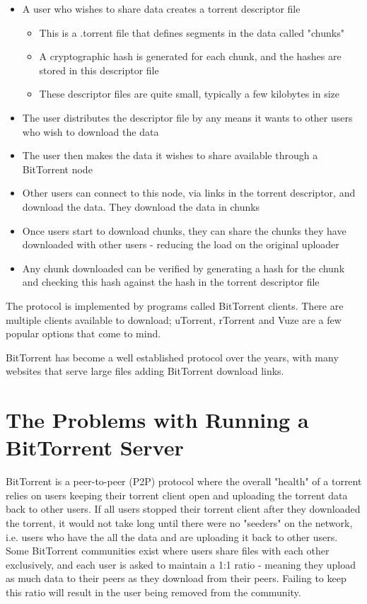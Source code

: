 \begin{itemize}
	\item A user who wishes to share data creates a torrent descriptor file
	\begin{itemize}	
		\item This is a .torrent file that defines segments in the data called "chunks"
		\item A cryptographic hash is generated for each chunk, and the hashes are stored in this descriptor file
		\item These descriptor files are quite small, typically a few kilobytes in size
	\end{itemize}  
	\item The user distributes the descriptor file by any means it wants to other users who wish to download the data
	\item The user then makes the data it wishes to share available through a BitTorrent node
	\item Other users can connect to this node, via links in the torrent descriptor, and download the data. They download the data in chunks 
	\item Once users start to download chunks, they can share the chunks they have downloaded with other users - reducing the load on the original uploader
	\item Any chunk downloaded can be verified by generating a hash for the chunk and checking this hash against the hash in the torrent descriptor file
\end{itemize}

The protocol is implemented by programs called BitTorrent clients. There are multiple clients available to download; uTorrent\cite{uTorrent}, rTorrent\cite{rTorrent} and Vuze\cite{Vuze} are a few popular options that come to mind.

BitTorrent has become a well established protocol over the years, with many websites that serve large files adding BitTorrent download links.


\section{The Problems with Running a BitTorrent Server}
BitTorrent is a peer-to-peer (P2P) protocol where the overall "health" of a torrent relies on users keeping their torrent client open and uploading the torrent data back to other users. If all users stopped their torrent client after they downloaded the torrent, it would not take long until there were no "seeders" on the network, i.e. users who have the all the data and are uploading it back to other users. Some BitTorrent communities exist where users share files with each other exclusively, and each user is asked to maintain a 1:1 ratio - meaning they upload as much data to their peers as they download from their peers. Failing to keep this ratio will result in the user being removed from the community. 

